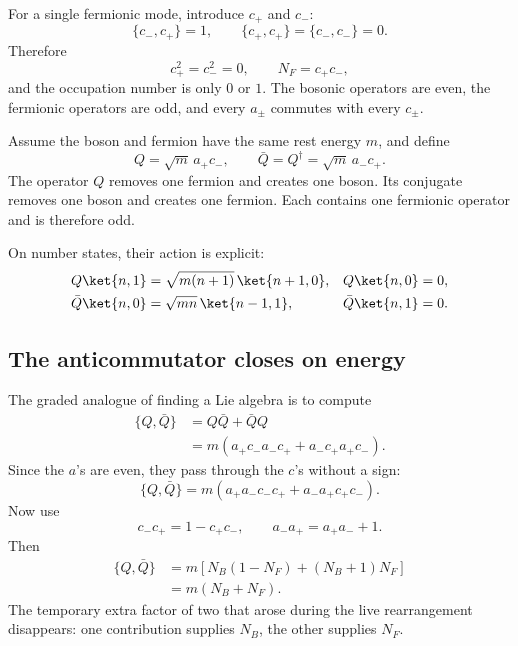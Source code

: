 For a single fermionic mode, introduce \(c_+\) and \(c_-\):
\begin{equation}
\{c_-,c_+\}=1,
\qquad
\{c_+,c_+\}=\{c_-,c_-\}=0.
\end{equation}
Therefore
\begin{equation}
c_+^2=c_-^2=0,
\qquad
N_F=c_+c_-,
\end{equation}
and the occupation number is only \(0\) or \(1\). The bosonic operators are even, the fermionic operators are odd, and every \(a_\pm\) commutes with every \(c_\pm\).


Assume the boson and fermion have the same rest energy \(m\), and define
\begin{equation}
Q=\sqrt m\,a_+c_-,
\qquad
\bar Q=Q^\dagger=\sqrt m\,a_-c_+.
\end{equation}
The operator \(Q\) removes one fermion and creates one boson. Its conjugate removes one boson and creates one fermion. Each contains one fermionic operator and is therefore odd.

On number states, their action is explicit:
\begin{align}
Q\ket{n,1}
&=\sqrt{m(n+1)}\,\ket{n+1,0},
&
Q\ket{n,0}&=0,\\
\bar Q\ket{n,0}
&=\sqrt{mn}\,\ket{n-1,1},
&
\bar Q\ket{n,1}&=0.
\end{align}

\subsection{The anticommutator closes on energy}

The graded analogue of finding a Lie algebra is to compute
\begin{align}
\{Q,\bar Q\}
&=Q\bar Q+\bar Q Q\\
&=m\left(a_+c_-a_-c_+
        +a_-c_+a_+c_-\right).
\end{align}
Since the \(a\)'s are even, they pass through the \(c\)'s without a sign:
\begin{equation}
\{Q,\bar Q\}
=m\left(a_+a_-c_-c_+
        +a_-a_+c_+c_-\right).
\end{equation}
Now use
\begin{equation}
c_-c_+=1-c_+c_-,
\qquad
a_-a_+=a_+a_-+1.
\end{equation}
Then
\begin{align}
\{Q,\bar Q\}
&=m\left[
N_B(1-N_F)+(N_B+1)N_F
\right]\\
&=m(N_B+N_F).
\end{align}
The temporary extra factor of two that arose during the live rearrangement disappears: one contribution supplies \(N_B\), the other supplies \(N_F\).

